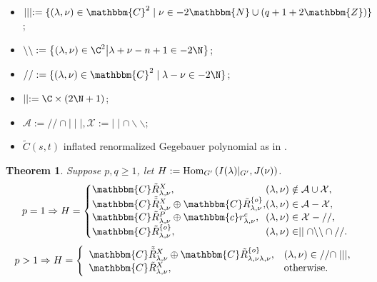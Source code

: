 \documentclass[portrait,final,paperwidth=90cm,paperheight=120cm,fontscale=0.3]{baposter}
\newcommand{\assign}{:=}
\newcommand{\tmop}[1]{\ensuremath{\operatorname{#1}}}
\newtheorem{theorem}{Theorem}
\newcommand{\Hom}{\mbox{\normalfont Hom}}
\newtheorem{corollary}[theorem]{Corollary}
\theoremstyle{definition}
\newcommand{\IlambdaGprime}{I(\lambda)\kern-0.3em\mid_{G'}}
\newcommand{\SBO}{\Hom_{G'}\left(\IlambdaGprime,J(\nu) \right)}
\newcommand{\mm}{\mid\mid}
\newcommand{\bb}{\backslash\backslash}
\renewcommand{\ss}{//}
\begin{document}
\begin{poster}
 {
\begin{itemize}
	\item $\mid \mid \mid \assign \{ (\lambda, \nu) \in \mathbbm{C}^2 \mid \nu \in
	- 2\mathbbm{N} \cup (q + 1 + 2\mathbbm{Z}) \}$;
	\item $\backslash\backslash:=\mysetn{(\lambda,\nu)\in\C^2}{\lambda+\nu-n+1\in-2\N}$;
	\item $/ / \assign
	\{ (\lambda, \nu) \in \mathbbm{C}^2 \mid \lambda - \nu \in
	-2\N \}$;
	\item$ \mid\mid:=\C\times\left( 2\N+1 \right)$;
	\item $\mathcal{A}:=\ss\cap\mid\mid\mid, \mathcal{X}:=\mm\cap\bb$;
	\item $\tilde{C}(s,t)$ inflated renormalized Gegebauer polynomial as in \cite[(16.3)]{kobayashi2015symmetry}.
	\end{itemize}
 }
{
\begin{theorem}\label{thm:classif}
	Suppose $p,q\ge1$, let $H:=\SBO$.
\[ p = 1 \Rightarrow H = \left\{
	\begin{array}{@{}l@{}l@{}}
		\mathbbm{C}\tilde{R}^X_{\lambda, \nu}, & (\lambda, \nu) \notin  \mathcal{A}\cup \mathcal{X}
     ,\\
     \mathbbm{C} \tilde{\tilde{R}}^X_{\lambda, \nu} \oplus \mathbbm{C}\tilde{R}^{\{ o
     \}}_{\lambda, \nu}, & (\lambda, \nu) \in \mathcal{A} -
     \mathcal{X},\\
     \mathbbm{C}\tilde{R}^P_{\lambda, \nu} \oplus \mathbbm{c}r^c_{\lambda, \nu}, &
     (\lambda, \nu) \in \mathcal{X} - / /,\\
     \mathbbm{C}\tilde{R}^{\{ o \}}_{\lambda, \nu}, & (\lambda, \nu) \in \mid \mid
     \cap \backslash\backslash \cap / /.
   \end{array} \right. \]
\[ p > 1 \Rightarrow H = \left\{
   \begin{array}{ll}
     \mathbbm{C} \tilde{\tilde{R}}^X_{\lambda, \nu} \oplus \mathbbm{C}\tilde{R}^{\{ o
     \}}_{\lambda, \nu \lambda, \nu}, & (\lambda, \nu) \in / / \cap \mid \mid
     \mid,\\
     \mathbbm{C}\tilde{R}^X_{\lambda, \nu}, & \tmop{otherwise.}
   \end{array} \right. \]
\end{theorem}
}
\end{poster}
\end{document}
